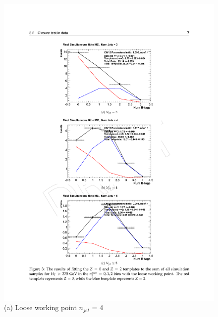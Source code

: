 \begin{figure}[ht]
\centering
\begin{minipage}[b]{0.55 \linewidth}
\includegraphics[width = 1.0\linewidth]{plots/template_mc_loose_njet4.pdf}
\centering (a) Loose working point $n_{jet}$ = 4 
\end{minipage}
\quad
\begin{minipage}[b]{0.55\linewidth}

\end{minipage}
\end{figure}
